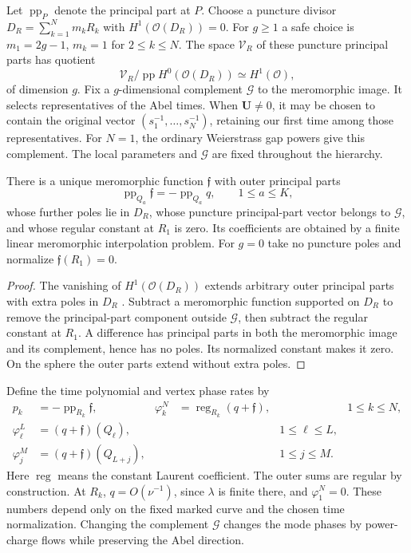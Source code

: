 Let $\operatorname{pp}_P$ denote the principal part at $P$.
Choose a puncture divisor $D_R=\sum_{k=1}^{N}m_kR_k$ with
$H^1(\mathcal O(D_R))=0$. For $g\geq1$ a safe choice is
$m_1=2g-1$, $m_k=1$ for $2\leq k\leq N$.
The space $\mathcal V_R$ of these puncture principal parts has
quotient
\[
 \mathcal V_R/
 \operatorname{pp}H^0(\mathcal O(D_R))\simeq H^1(\mathcal O),
\]
of dimension $g$. Fix a $g$-dimensional complement $\mathcal G$
to the meromorphic image. It selects representatives of the Abel
times. When $\boldsymbol U\ne0$, it may be chosen to contain the
original vector $(s_1^{-1},\ldots,s_N^{-1})$, retaining our first
time among those representatives. For $N=1$, the ordinary
Weierstrass gap powers give this complement. The local parameters
and $\mathcal G$ are fixed throughout the hierarchy.

\begin{lemma}\label{lem:BA-higher-normalization}
There is a unique meromorphic function $\mathfrak f$ with outer
principal parts
\[
 \operatorname{pp}_{Q_a}\mathfrak f=-\operatorname{pp}_{Q_a}q,
 \qquad1\leq a\leq K,
\]
whose further poles lie in $D_R$, whose puncture principal-part
vector belongs to $\mathcal G$, and whose regular constant at $R_1$
is zero. Its coefficients are obtained by a finite linear
meromorphic interpolation problem.
For $g=0$ take no puncture poles and normalize $\mathfrak f(R_1)=0$.
\end{lemma}
\begin{proof}
The vanishing of $H^1(\mathcal O(D_R))$ extends arbitrary outer
principal parts with extra poles in $D_R$
\cite[Chapter~IV]{Hartshorne1977}. Subtract a meromorphic function
supported on $D_R$ to remove the principal-part component outside
$\mathcal G$, then subtract the regular constant at $R_1$.
A difference has principal parts in both the meromorphic image and
its complement, hence has no poles. Its normalized constant makes
it zero. On the sphere the outer parts extend without extra poles.
\end{proof}

Define the time polynomial and vertex phase rates by
\begin{equation}\label{eq:BA-higher-time-phase}
\begin{aligned}
 p_k&=-\operatorname{pp}_{R_k}\mathfrak f,&
 \varphi_k^N&=\operatorname{reg}_{R_k}(q+\mathfrak f),&&1\leq k\leq N,\\
 \varphi_{\ell}^L&=(q+\mathfrak f)(Q_{\ell}),&&&1\leq\ell\leq L,\\
 \varphi_j^M&=(q+\mathfrak f)(Q_{L+j}),&&&1\leq j\leq M.
\end{aligned}
\end{equation}
Here $\operatorname{reg}$ means the constant Laurent coefficient.
The outer sums are regular by construction. At $R_k$,
$q=O(\nu^{-1})$, since $\lambda$ is finite there, and
$\varphi_1^N=0$. These numbers depend only on the fixed marked
curve and the chosen time normalization. Changing the complement
$\mathcal G$ changes the mode phases by power-charge flows while
preserving the Abel direction.

